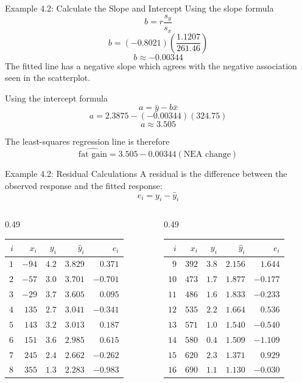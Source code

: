 \documentclass[aspectratio=169]{beamer}
\begin{document}
\begin{frame}{Example 4.2: Calculate the Slope and Intercept}
\small
Using the slope formula
$$b=r\frac{s_y}{s_x}$$
$$b=(-0.8021)\left(\frac{1.1207}{261.46}\right)$$
$$b\approx-0.00344$$
The fitted line has a negative slope which agrees with the negative association seen in the scatterplot.

Using the intercept formula
$$a=\bar y-b\bar x$$
$$a=2.3875-(-0.00344)(324.75)$$
$$a\approx3.505$$

The least-squares regression line is therefore
$$\widehat{\text{fat gain}}=3.505-0.00344(\text{NEA change})$$
\end{frame}

\begin{frame}{Example 4.2: Residual Calculations}
\scriptsize
A residual is the difference between the observed response and the fitted response:
$$e_i=y_i-\hat{y}_i$$

\begin{columns}[T,onlytextwidth]
\begin{column}{0.49\textwidth}
\centering
\setlength{\tabcolsep}{3.5pt}
\renewcommand{\arraystretch}{1.08}
\begin{tabular}{rrrrr}
\toprule
$i$ & $x_i$ & $y_i$ & $\hat{y}_i$ & $e_i$ \\
\midrule
$1$ & $-94$ & $4.2$ & $3.829$ & $0.371$ \\
$2$ & $-57$ & $3.0$ & $3.701$ & $-0.701$ \\
$3$ & $-29$ & $3.7$ & $3.605$ & $0.095$ \\
$4$ & $135$ & $2.7$ & $3.041$ & $-0.341$ \\
$5$ & $143$ & $3.2$ & $3.013$ & $0.187$ \\
$6$ & $151$ & $3.6$ & $2.985$ & $0.615$ \\
$7$ & $245$ & $2.4$ & $2.662$ & $-0.262$ \\
$8$ & $355$ & $1.3$ & $2.283$ & $-0.983$ \\
\bottomrule
\end{tabular}
\end{column}
\begin{column}{0.49\textwidth}
\centering
\setlength{\tabcolsep}{3.5pt}
\renewcommand{\arraystretch}{1.08}
\begin{tabular}{rrrrr}
\toprule
$i$ & $x_i$ & $y_i$ & $\hat{y}_i$ & $e_i$ \\
\midrule
$9$  & $392$ & $3.8$ & $2.156$ & $1.644$ \\
$10$ & $473$ & $1.7$ & $1.877$ & $-0.177$ \\
$11$ & $486$ & $1.6$ & $1.833$ & $-0.233$ \\
$12$ & $535$ & $2.2$ & $1.664$ & $0.536$ \\
$13$ & $571$ & $1.0$ & $1.540$ & $-0.540$ \\
$14$ & $580$ & $0.4$ & $1.509$ & $-1.109$ \\
$15$ & $620$ & $2.3$ & $1.371$ & $0.929$ \\
$16$ & $690$ & $1.1$ & $1.130$ & $-0.030$ \\
\bottomrule
\end{tabular}
\end{column}
\end{columns}


\end{frame}
\end{document}

